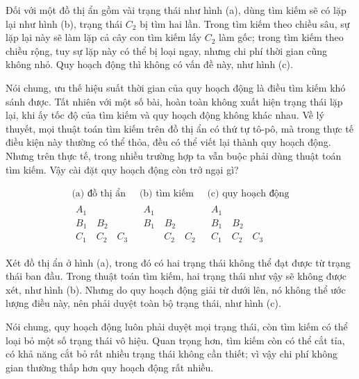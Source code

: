 \documentclass[11pt]{article}
\begin{document}
Đối với một đồ thị ẩn gồm vài trạng thái như hình (a), dùng tìm kiếm sẽ có
lặp lại như hình (b), trạng thái \(C_2\) bị tìm hai lần. Trong tìm kiếm theo
chiều sâu, sự lặp lại này sẽ làm lặp cả cây con tìm kiếm lấy \(C_2\) làm
gốc; trong tìm kiếm theo chiều rộng, tuy sự lặp này có thể bị loại ngay,
nhưng chi phí thời gian cũng không nhỏ. Quy hoạch động thì không có vấn đề
này, như hình (c).

Nói chung, ưu thế hiệu suất thời gian của quy hoạch động là điều tìm kiếm khó
sánh được. Tất nhiên với một số bài, hoàn toàn không xuất hiện trạng thái lặp
lại, khi ấy tốc độ của tìm kiếm và quy hoạch động không khác nhau. Về lý
thuyết, mọi thuật toán tìm kiếm trên đồ thị ẩn có thứ tự tô-pô, mà trong thực
tế điều kiện này thường có thể thỏa, đều có thể viết lại thành quy hoạch
động. Nhưng trên thực tế, trong nhiều trường hợp ta vẫn buộc phải dùng thuật
toán tìm kiếm. Vậy cài đặt quy hoạch động còn trở ngại gì?

\[
\begin{array}{ccc}
\text{(a) đồ thị ẩn} & \text{(b) tìm kiếm} & \text{(c) quy hoạch động}\\
\begin{array}{c}
A_1\\
B_1\quad B_2\\
C_1\quad C_2\quad C_3
\end{array}
&
\begin{array}{c}
A_1\\
B_1\quad B_2\\
\phantom{C_1\quad}C_2\quad C_2
\end{array}
&
\begin{array}{c}
A_1\\
B_1\quad B_2\\
C_1\quad C_2\quad C_3
\end{array}
\end{array}
\]

Xét đồ thị ẩn ở hình (a), trong đó có hai trạng thái không thể đạt được từ
trạng thái ban đầu. Trong thuật toán tìm kiếm, hai trạng thái như vậy sẽ
không được xét, như hình (b). Nhưng do quy hoạch động giải từ dưới lên, nó
không thể ước lượng điều này, nên phải duyệt toàn bộ trạng thái, như hình
(c).

Nói chung, quy hoạch động luôn phải duyệt mọi trạng thái, còn tìm kiếm có thể
loại bỏ một số trạng thái vô hiệu. Quan trọng hơn, tìm kiếm còn có thể cắt
tỉa, có khả năng cắt bỏ rất nhiều trạng thái không cần thiết; vì vậy chi phí
không gian thường thấp hơn quy hoạch động rất nhiều.
\end{document}
